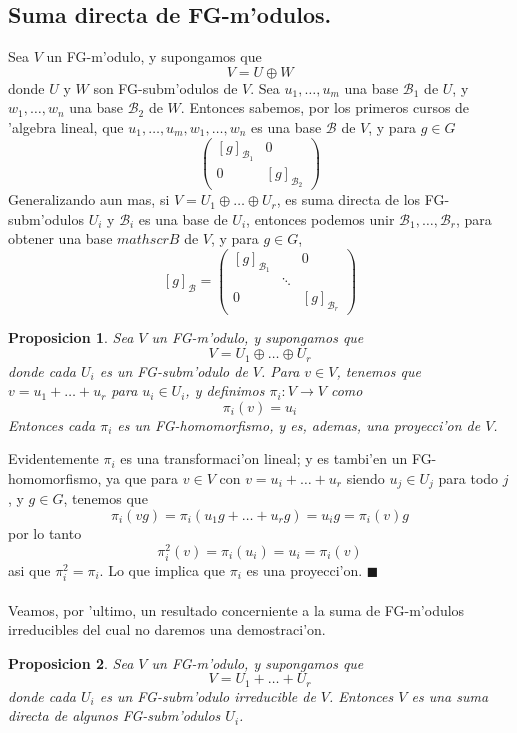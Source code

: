 \documentclass[a4paper,openright,12pt]{report}
\numberwithin{equation}{section} %
\newtheorem{proposicion}{Proposicion}[section] %
\newenvironment{proof}{\noindent{\it Demostracion:}}{\hfill$\blacksquare$} %
\begin{document}
\subsection{Suma directa de FG-m'odulos.}
Sea $V$ un FG-m'odulo, y supongamos que
\[
V=U \oplus W
\]
donde $U$ y $W$ son FG-subm'odulos de $V$. Sea $u_{1}, \ldots ,u_{m}$ una base $\mathscr{B}_{1}$ de $U$, y $w_{1}, \ldots ,w_{n}$ una base $\mathscr{B}_{2}$ de $W$. Entonces sabemos, por los primeros cursos de 'algebra lineal, que $u_{1}, \ldots ,u_{m},w_{1}, \ldots ,w_{n}$ es una base $\mathscr{B}$ de $V$, y para $g \in G$
\[
\left( \begin{array}{c|c}
  [g]_{\mathscr{B}_{1}} & 0 \\ 
  \hline
  0 & [g]_{\mathscr{B}_{2}}
 \end{array} \right)
\]
Generalizando aun mas, si $V=U_{1} \oplus \ldots \oplus U_{r}$, es suma directa de los FG-subm'odulos $U_{i}$ y $\mathscr{B}_{i}$ es una base de $U_{i}$, entonces podemos unir $\mathscr{B}_{1}, \ldots ,\mathscr{B}_{r}$, para obtener una base $mathscr{B}$ de $V$, y para $g \in G$,
\[
[g]_{\mathscr{B}} =
\left( \begin{array}{ccc}
 [g]_{\mathscr{B}_{1}} & & 0 \\ 
  
   & \ddots &  \\
  0 & & [g]_{\mathscr{B}_{r}}
\end{array} \right) 
\]
\begin{proposicion}
Sea $V$ un FG-m'odulo, y supongamos que
\[
V=U_{1} \oplus \ldots \oplus U_{r}
\]
donde cada $U_{i}$ es un FG-subm'odulo de $V$. Para $v \in V$, tenemos que $v=u_{1}+ \ldots + u_{r}$ para $u_{i} \in U_{i}$, y definimos $\pi_{i}:V \rightarrow V$ como 
\[
\pi_{i}(v)=u_{i}
\]
Entonces cada $\pi_{i}$ es un FG-homomorfismo, y es, ademas, una proyecci'on de $V$.
\end{proposicion}
\begin{proof}
Evidentemente $\pi_{i}$ es una transformaci'on lineal; y es tambi'en un FG-homomorfismo, ya que para $v \in V$ con $v=u_{i}+ \ldots +u_{r}$ siendo $u_{j} \in U_{j}$ para todo $j$, y $g \in G$, tenemos que
\[
\pi_{i}(vg)=\pi_{i}(u_{1}g+ \ldots +u_{r}g)=u_{i}g=\pi_{i}(v)g
\]
por lo tanto 
\[
\pi_{i}^{2}(v)=\pi_{i}(u_{i})=u_{i}=\pi_{i}(v)
\]
asi que $\pi_{i}^{2}=\pi_{i}$. Lo que implica que $\pi_{i}$ es una proyecci'on.
\end{proof}\\
\\
Veamos, por 'ultimo, un resultado concerniente a la suma de FG-m'odulos irreducibles del cual no daremos una demostraci'on.
\begin{proposicion}
Sea $V$ un FG-m'odulo, y supongamos que
\[
V=U_{1}+\ldots +U_{r}
\]
donde cada $U_{i}$ es un FG-subm'odulo irreducible de $V$. Entonces $V$ es una suma directa de algunos FG-subm'odulos $U_{i}$.
\end{proposicion}
\end{document}
